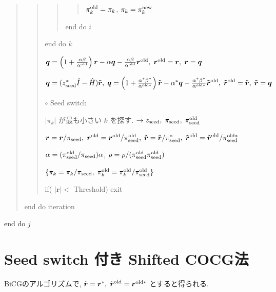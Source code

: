 \documentclass[letterpaper,10pt,dvipdfmx,openany]{sphinxmanual}
\begin{document}
\begin{quote}
\begin{quote}
\begin{quote}
\begin{quote}
\(\pi_k^{\rm old} = \pi_k\), \(\pi_k = \pi_k^{\rm new}\)
\end{quote}

end do \(i\)
\end{quote}

end do \(k\)

\({\boldsymbol q} = \left( 1 + \frac{\alpha \beta}{\alpha^{\rm old}} \right) {\boldsymbol r} - \alpha {\boldsymbol q} - \frac{\alpha \beta}{\alpha^{\rm old}} {\boldsymbol r}^{\rm old},\; {\boldsymbol r}^{\rm old} = {\boldsymbol r},\; {\boldsymbol r} = {\boldsymbol q}\)

\({\boldsymbol q} = (z_{\rm seed}^* {\hat I} - {\hat H}) {\tilde {\boldsymbol r}},\; {\boldsymbol q} = \left( 1 + \frac{\alpha^* \beta^*}{\alpha^{{\rm old}*}} \right) {\tilde {\boldsymbol r}} - \alpha^* {\boldsymbol q} - \frac{\alpha^* \beta^*}{\alpha^{{\rm old} *}} {\tilde {\boldsymbol r}}^{\rm old},\; {\tilde {\boldsymbol r}}^{\rm old} = {\tilde {\boldsymbol r}},\; {\tilde {\boldsymbol r}} = {\boldsymbol q}\)

\(\circ\) Seed switch

\(|\pi_k|\) が最も小さい \(k\) を探す. \(\rightarrow z_{\rm seed},\; \pi_{\rm seed},\; \pi_{\rm seed}^{\rm old}\)

\({\boldsymbol r} = {\boldsymbol r} / \pi_{\rm seed},\; {\boldsymbol r}^{\rm old} = {\boldsymbol r}^{\rm old} / \pi_{\rm seed}^{\rm old},\; {\tilde {\boldsymbol r}} = {\tilde {\boldsymbol r}} / \pi_{\rm seed}^*,\; {\tilde {\boldsymbol r}}^{\rm old} = {\tilde {\boldsymbol r}}^{\rm old} / \pi_{\rm seed}^{{\rm old}*}\)

\(\alpha = (\pi_{\rm seed}^{\rm old} / \pi_{\rm seed}) \alpha\), \(\rho = \rho / (\pi_{\rm seed}^{\rm old} \pi_{\rm seed}^{\rm old})\)

\(\{\pi_k = \pi_k / \pi_{\rm seed},\; \pi_k^{\rm old} = \pi_k^{\rm old} / \pi_{\rm seed}^{\rm old}\}\)

if( \(|{\boldsymbol r}| <\) Threshold) exit
\end{quote}

end do iteration
\end{quote}

end do \(j\)


\section{Seed switch 付き Shifted COCG法}
\label{komega_algorithm_ja:seed-switch-shifted-cocg}
BiCGのアルゴリズムで,
\({\tilde {\boldsymbol r}} = {\boldsymbol r}^*,\; {\tilde {\boldsymbol r}}^{\rm old} = {\boldsymbol r}^{{\rm old}*}\) とすると得られる.
\end{document}
